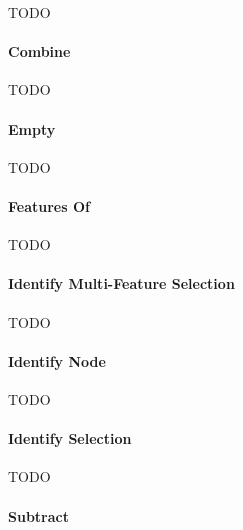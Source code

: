 TODO

\paragraph{Combine}

TODO

\paragraph{Empty}

TODO

\paragraph{Features Of}

TODO

\paragraph{Identify Multi-Feature Selection}

TODO

\paragraph{Identify Node}

TODO

\paragraph{Identify Selection}

TODO

\paragraph{Subtract}

